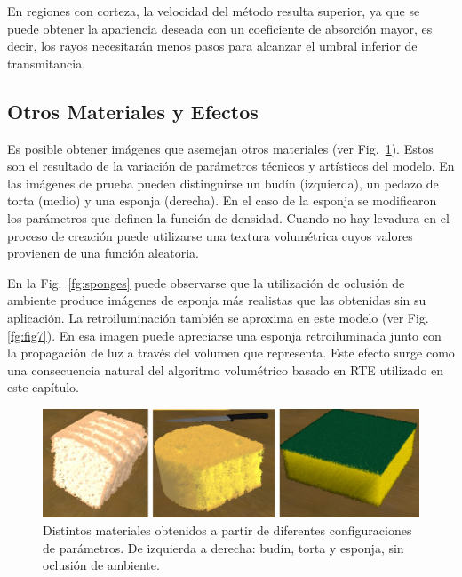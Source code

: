 En regiones con corteza, la velocidad del método resulta superior, ya que se puede obtener la apariencia deseada con un coeficiente de absorción mayor, es decir, los rayos necesitarán menos pasos para alcanzar el umbral inferior de transmitancia.

\subsection{Otros Materiales y Efectos}
Es posible obtener imágenes que asemejan otros materiales (ver Fig.~\ref{fg:fig6}).
Estos son el resultado de la variación de parámetros técnicos y artísticos del modelo.
En las imágenes de prueba pueden distinguirse un budín (izquierda), un pedazo de torta (medio) y una esponja (derecha).
En el caso de la esponja se modificaron los parámetros que definen la función de densidad.
Cuando no hay levadura en el proceso de creación puede utilizarse una textura volumétrica cuyos valores provienen de una función aleatoria.

En la Fig.~\ref{fg:sponges} puede observarse que la utilización de oclusión de ambiente produce imágenes de esponja más realistas que las obtenidas sin su aplicación.
La retroiluminación también se aproxima en este modelo (ver Fig. \ref{fg:fig7}).
En esa imagen puede apreciarse una esponja retroiluminada junto con la propagación de luz a través del volumen que representa.
Este efecto surge como una consecuencia natural del algoritmo volumétrico basado en RTE utilizado en este capítulo.

\begin{figure}[htb!]
  \centerline{\includegraphics[width=13cm]{figures/fig6}}
  \caption[Budín, torta y esponja renderizados]{Distintos materiales obtenidos a partir de diferentes configuraciones de parámetros. De izquierda a derecha: budín, torta y esponja, sin oclusión de ambiente. }
  \label{fg:fig6}

\end{figure}

